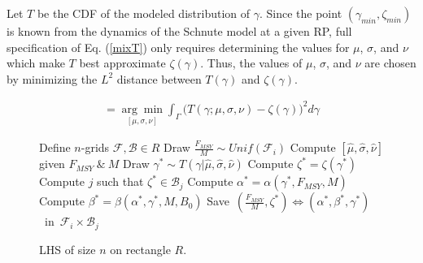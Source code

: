 \documentclass[12pt]{article}
\begin{document}
%
Let $T$ be the CDF of the modeled distribution of $\gamma$. Since the point 
$(\gamma_{min}, \zeta_{min})$ is known from the dynamics of the Schnute model 
at a given RP, full specification of Eq. (\ref{mixT}) only requires determining 
the values for $\mu$, $\sigma$, and $\nu$ which make $T$ best approximate 
$\zeta(\gamma)$. Thus, the values of $\mu$, $\sigma$, and $\nu$ are chosen by 
minimizing the $L^2$ distance between $T(\gamma)$ and $\zeta(\gamma)$.

\begin{align}
[\hat\mu, \hat\sigma, \hat\nu]=\underset{{[\mu, \sigma, \nu]}}{\arg\min}\int_\Gamma \big(T(\gamma; \mu, \sigma, \nu) - \zeta(\gamma)\big)^2 d\gamma
\end{align}  


%
\begin{figure}
	\vspace{-0.5cm}
	\begin{minipage}{0.5\textwidth}
      		\begin{algorithm}[H]
			\caption{LHS of size $n$ on rectangle $R$.}
			\label{lhsAlg}
			\begin{algorithmic}[1]
			\State Define $n$-grids $\mathcal{F}, \mathcal{B}\in R$
			\State Draw $\frac{F_{MSY}}{M} \sim Unif(\mathcal{F}_i)$
			\State Compute $[\hat\mu, \hat\sigma, \hat\nu]$ given $F_{MSY}~\&~M$
				\State Draw $\gamma^* \sim T(\gamma|\hat\mu, \hat\sigma, \hat\nu)$
				\State Compute $\zeta^* = \zeta(\gamma^*)$
				\State Compute $j$ such that $\zeta^*\in\mathcal{B}_j$
			\EndWhile
			\State Compute $\alpha^* = \alpha(\gamma^*, F_{MSY}, M)$ 
			\State Compute $\beta^* = \beta(\alpha^*, \gamma^*, M, B_0)$	
			\State \mbox{Save $(\frac{F_{MSY}}{M}, \zeta^*)\Leftrightarrow(\alpha^*, \beta^*, \gamma^*)$ in $\mathcal{F}_i\times\mathcal{B}_j$} 
			\EndFor
			\EndProcedure
			\end{algorithmic}
		\end{algorithm}
	\end{minipage}
\end{figure}
\end{document}
